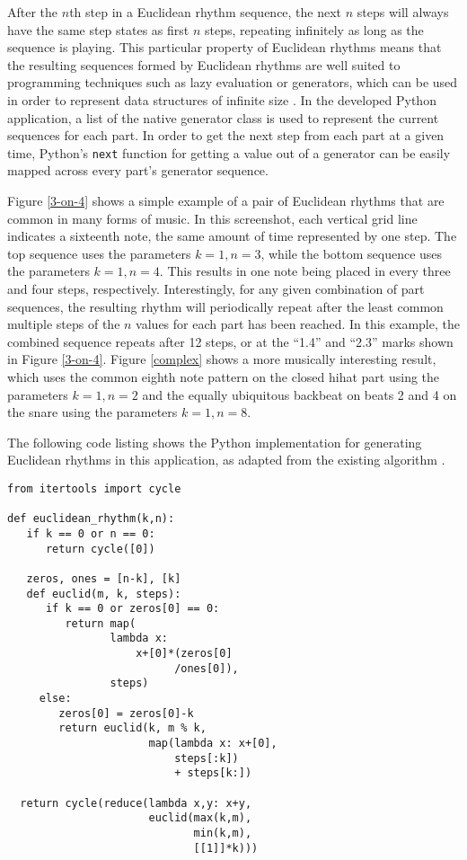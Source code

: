 \documentclass{sig-alternate-05-2015}
\begin{document}
After the $n$th step in a Euclidean rhythm sequence, the next $n$ steps will always have the same step states as first $n$ steps, repeating infinitely as long as the sequence is playing. This particular property of Euclidean rhythms means that the resulting sequences formed by Euclidean rhythms are well suited to programming techniques such as lazy evaluation or generators, which can be used in order to represent data structures of infinite size \cite{henderson1976lazy}. In the developed Python application, a list of the native generator class is used to represent the current sequences for each part. In order to get the next step from each part at a given time, Python's \texttt{next} function for getting a value out of a generator can be easily mapped across every part's generator sequence.

Figure \ref{3-on-4} shows a simple example of a pair of Euclidean rhythms that are common in many forms of music. In this screenshot, each vertical grid line indicates a sixteenth note, the same amount of time represented by one step. The top sequence uses the parameters $k=1, n=3$, while the bottom sequence uses the parameters $k=1, n=4$. This results in one note being placed in every three and four steps, respectively. Interestingly, for any given combination of part sequences, the resulting rhythm will periodically repeat after the least common multiple steps of the $n$ values for each part has been reached. In this example, the combined sequence repeats after 12 steps, or at the ``1.4'' and ``2.3'' marks shown in Figure \ref{3-on-4}. Figure \ref{complex} shows a more musically interesting result, which uses the common eighth note pattern on the closed hihat part using the parameters $k=1, n=2$ and the equally ubiquitous backbeat on beats 2 and 4 on the snare using the parameters $k=1, n=8$. 

The following code listing shows the Python implementation for generating Euclidean rhythms in this application, as adapted from the existing algorithm \cite{toussaint2005euclidean}.

\lstset{language=Python} 
\begin{lstlisting}
from itertools import cycle

def euclidean_rhythm(k,n):
   if k == 0 or n == 0: 
      return cycle([0])

   zeros, ones = [n-k], [k]
   def euclid(m, k, steps):
      if k == 0 or zeros[0] == 0: 
         return map(
                lambda x: 
                    x+[0]*(zeros[0]
                          /ones[0]), 
                steps)
     else:      
        zeros[0] = zeros[0]-k
        return euclid(k, m % k,
                      map(lambda x: x+[0], 
                          steps[:k]) 
                          + steps[k:])

  return cycle(reduce(lambda x,y: x+y, 
                      euclid(max(k,m), 
                             min(k,m), 
                             [[1]]*k)))
\end{lstlisting}
\end{document}
